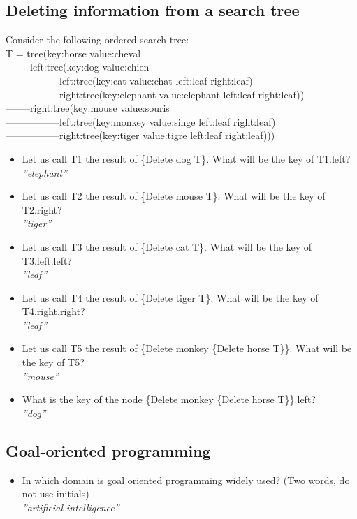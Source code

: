 \documentclass[fr,license=none]{../../../eplsummary}
\begin{document}
		\subsection{Deleting information from a search tree}
			Consider the following ordered search tree:\\
			T = tree(key:horse value:cheval\\
			--------left:tree(key:dog value:chien\\
			-----------------left:tree(key:cat value:chat left:leaf right:leaf)\\
			-----------------right:tree(key:elephant value:elephant left:leaf right:leaf))\\
			--------right:tree(key:mouse value:souris\\
			-----------------left:tree(key:monkey value:singe left:leaf right:leaf)\\
			-----------------right:tree(key:tiger value:tigre left:leaf right:leaf)))
			\begin{itemize}
				\item Let us call T1 the result of \{Delete dog T\}. What will be the key of T1.left? \\
					\textit{''elephant''}
				\item Let us call T2 the result of \{Delete mouse T\}. What will be the key of T2.right? \\
					\textit{''tiger''}
				\item Let us call T3 the result of \{Delete cat T\}. What will be the key of T3.left.left?\\ 
					\textit{''leaf''}
				\item Let us call T4 the result of \{Delete tiger T\}. What will be the key of T4.right.right? \\
					\textit{''leaf''}
				\item Let us call T5 the result of \{Delete monkey \{Delete horse T\}\}. What will be the key of T5? \\
					\textit{''mouse''}
				\item What is the key of the node \{Delete monkey \{Delete horse T\}\}.left? \\
					\textit{''dog''}
			\end{itemize}
		\subsection{Goal-oriented programming}
			\begin{itemize}
				\item In which domain is goal oriented programming widely used? (Two words, do not use initials)\\
					\textit{''artificial intelligence''}
			\end{itemize}
\end{document}
